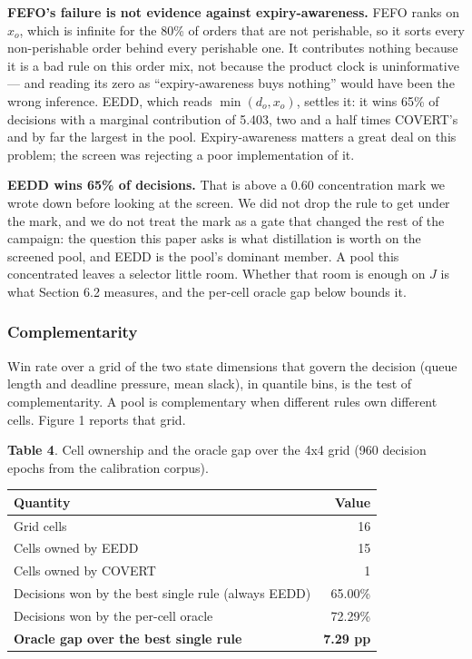 \documentclass[review,3p,times]{elsarticle}
\newcounter{none}
\theoremstyle{definition}
\begin{document}
\textbf{FEFO's failure is not evidence against expiry-awareness.} FEFO
ranks on \(x_o\), which is infinite for the 80\% of orders that are not
perishable, so it sorts every non-perishable order behind every
perishable one. It contributes nothing because it is a bad rule on this
order mix, not because the product clock is uninformative --- and
reading its zero as ``expiry-awareness buys nothing'' would have been
the wrong inference. EEDD, which reads \(\min(d_o, x_o)\), settles it:
it wins 65\% of decisions with a marginal contribution of 5.403, two and
a half times COVERT's and by far the largest in the pool.
Expiry-awareness matters a great deal on this problem; the screen was
rejecting a poor implementation of it.

\textbf{EEDD wins 65\% of decisions.} That is above a 0.60 concentration
mark we wrote down before looking at the screen. We did not drop the
rule to get under the mark, and we do not treat the mark as a gate that
changed the rest of the campaign: the question this paper asks is what
distillation is worth on the screened pool, and EEDD is the pool's
dominant member. A pool this concentrated leaves a selector little room.
Whether that room is enough on \(J\) is what Section 6.2 measures, and
the per-cell oracle gap below bounds it.

\subsubsection{Complementarity}\label{complementarity}

Win rate over a grid of the two state dimensions that govern the
decision (queue length and deadline pressure, mean slack), in quantile
bins, is the test of complementarity. A pool is complementary when
different rules own different cells. Figure 1 reports that grid.

\textbf{Table 4}. Cell ownership and the oracle gap over the 4x4 grid
(960 decision epochs from the calibration corpus).

{\def\LTcaptype{none} %
\begin{longtable}[]{@{}lr@{}}
\toprule\noalign{}
Quantity & Value \\
\midrule\noalign{}
\endhead
\bottomrule\noalign{}
\endlastfoot
Grid cells & 16 \\
Cells owned by EEDD & 15 \\
Cells owned by COVERT & 1 \\
Decisions won by the best single rule (always EEDD) & 65.00\% \\
Decisions won by the per-cell oracle & 72.29\% \\
\textbf{Oracle gap over the best single rule} & \textbf{7.29 pp} \\
\end{longtable}
}
\end{document}
